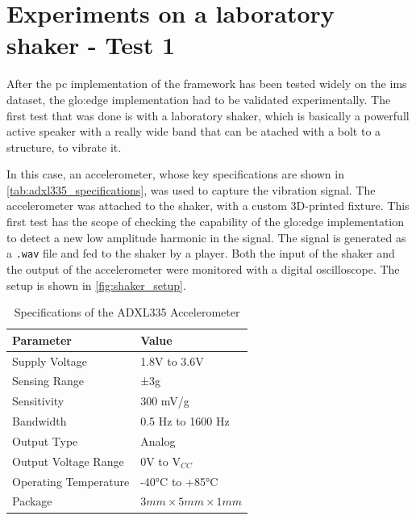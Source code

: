 \section{Experiments on a laboratory shaker - Test 1}

After the \gls{pc} implementation of the framework has been tested widely on the \gls{ims} dataset, the \gls{glo:edge} implementation had to be validated experimentally. The first test that was done is with a laboratory shaker, which is basically a powerfull active speaker with a really wide band that can be atached with a bolt to a structure, to vibrate it.

In this case, an accelerometer, whose key specifications are shown in \autoref{tab:adxl335_specifications}, was used to capture the vibration signal. The accelerometer was attached to the shaker, with a custom 3D-printed fixture. This first test has the scope of checking the capability of the \gls{glo:edge} implementation to detect a new low amplitude harmonic in the signal. The signal is generated as a \texttt{.wav} file and fed to the shaker by a player. Both the input of the shaker and the output of the accelerometer were monitored with a digital oscilloscope. The setup is shown in \autoref{fig:shaker_setup}.



\begin{table}[h]
    \centering
    \caption{Specifications of the ADXL335 Accelerometer}
    \label{tab:adxl335_specifications}
    \begin{tabular}{ll} 
    \toprule
    \textbf{Parameter} & \textbf{Value} \\ 
    \hline
    Supply Voltage & 1.8V to 3.6V \\
    Sensing Range & ±3g \\
    Sensitivity & 300 mV/g \\
    Bandwidth & 0.5 Hz to 1600 Hz \\
    Output Type & Analog \\
    Output Voltage Range & 0V to V$_{CC}$ \\
    Operating Temperature & -40°C to +85°C \\
    Package & $3\si{mm} \times 5 \si{mm} \times 1 \si{mm}$ \\
    \bottomrule
    \end{tabular}
\end{table}

